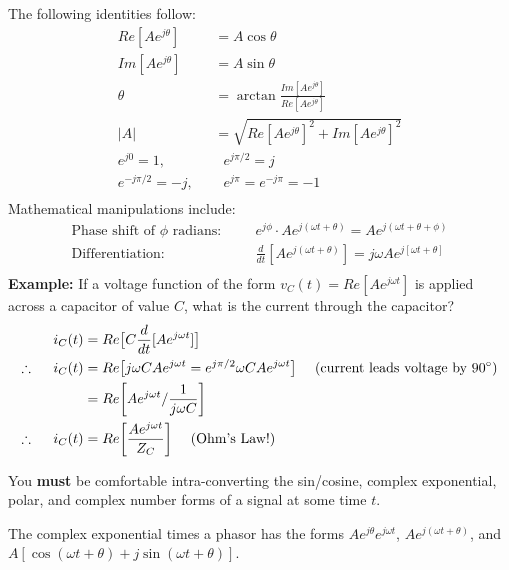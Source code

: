 \documentclass[11pt]{report}
\begin{document}
The following identities follow:
\begin{equation}
\begin{split}
Re[Ae^{j\theta}] &= A \cos\theta\\
Im[Ae^{j\theta}] &= A \sin\theta\\
\theta &= \arctan\frac{Im[Ae^{j\theta}]}{Re[Ae^{j\theta}]}\\
|A| &= \sqrt{Re[Ae^{j\theta}]^2+Im[Ae^{j\theta}]^2}\\
e^{j0} = 1,~~~&~~~e^{j\pi/2} = j\\
e^{-j\pi/2} = -j,~~~&~~~e^{j\pi} = e^{-j\pi} =-1\\
\end{split}
\end{equation}
Mathematical manipulations include:
\begin{equation}
\begin{split}
\text{Phase shift of } \phi \text{ radians:~~~~~}& e^{j\phi}\cdot
Ae^{j(\omega t + \theta)} = Ae^{j(\omega t + \theta+\phi)}\\
\text{Differentiation:~~~~~}&
\frac{d}{dt}[Ae^{j(\omega t + \theta)}] = j\omega Ae^{j[\omega t + \theta]}\\
\end{split}
\end{equation}
\textbf{Example:} If a voltage function of the form $v_{C}(t) =
Re[Ae^{j\omega t}]$ is applied across a capacitor of value $C$, what is
the current through the capacitor?
\begin{equation}
\begin{split}
i_{C}(t) &= Re\big{[}C\frac{d}{dt}[Ae^{j\omega t}]\big{]}\\
\therefore ~~~~i_{C}(t) &= Re\big{[}j\omega C Ae^{j\omega t} = e^{j \pi/2}\omega C Ae^{j\omega t}\big{]}
~~~~(\text{current leads voltage by }90^\circ) \\
&= Re\bigg{[}Ae^{j\omega t} / \frac{1}{j\omega C}\bigg{]}\\
\therefore ~~~~i_{C}(t)&= Re\bigg{[}\frac{Ae^{j\omega t}}{Z_C}\bigg{]}~~~~\text{(Ohm's Law!)} 
\end{split}
\end{equation}

You \textbf{must} be comfortable intra-converting the sin/cosine,
complex exponential, polar, and complex number forms of a signal at some time
$t$.

The complex exponential times a phasor has the forms
$Ae^{j\theta}e^{j\omega t}$, $Ae^{j(\omega t + \theta)}$, and
$A[\cos(\omega t+\theta) + j\sin(\omega t+\theta)]$.
\end{document}
